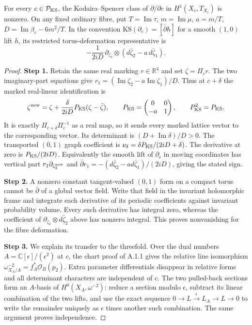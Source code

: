 \begin{cited}[FAM A.4.2; K]\label{fam:A.4.2}
For every $c\in\mathcal P_{\rm KS}$, the Kodaira--Spencer class of $\partial/\partial c$ in $H^1(X_c,T_{X_c})$ is nonzero. On any fixed ordinary fibre, put $T=\operatorname{Im}\tau$, $m=\operatorname{Im}\mu$, $a=m/T$, $D=\operatorname{Im}\beta_c-6m^2/T$. In the convention $\mathrm{KS}(\partial_c)=[\bar\partial h]$ for a smooth $(1,0)$ lift $h$, its restricted torus-deformation representative is
\[
 -\frac{1}{2iD}\,\partial_{\zeta_2}\otimes
       (d\bar\zeta_2-a\,d\bar\zeta_1).
\]
\end{cited}
\begin{proof}
\par\smallskip\noindent\textbf{Step 1.} Retain the same real marking $r\in\mathbb R^4$ and set $\zeta=\Pi_cr$. The two imaginary-part equations give
$r_1=(\operatorname{Im}\zeta_2-a\operatorname{Im}\zeta_1)/D$. Thus at $c+\delta$ the marked real-linear identification is
\[
 \zeta^{\rm new}=\zeta+\frac{\delta}{2iD}P_{\rm KS}(\zeta-\bar\zeta),\qquad
 P_{\rm KS}=\begin{pmatrix}0&0\\-a&1\end{pmatrix},\qquad P_{\rm KS}^2=P_{\rm KS}.
\]
It is exactly $\Pi_{c+\delta}\Pi_c^{-1}$ as a real map, so it sends every marked lattice vector to the corresponding vector. Its determinant is $(D+\operatorname{Im}\delta)/D>0$. The transported $(0,1)$ graph coefficient is $\nu_\delta=\delta P_{\rm KS}/(2iD+\delta)$. The derivative at zero is $P_{\rm KS}/(2iD)$. Equivalently the smooth lift of $\partial_c$ in moving coordinates has vertical part $r_1\partial_{\zeta^{\rm new}_2}$ and $\bar\partial r_1=-(d\bar\zeta_2-a d\bar\zeta_1)/(2iD)$, giving the stated sign.

\par\smallskip\noindent\textbf{Step 2.} A nonzero constant tangent-valued $(0,1)$ form on a compact torus cannot be $\bar\partial$ of a global vector field. Write that field in the invariant holomorphic frame and integrate each derivative of its periodic coefficients against invariant probability volume. Every such derivative has integral zero, whereas the coefficient of $\partial_{\zeta_2}\otimes d\bar\zeta_2$ above has nonzero integral. This proves nonvanishing for the fibre deformation.

\par\smallskip\noindent\textbf{Step 3.} We explain its transfer to the threefold. Over the dual numbers $A=\mathbb C[\epsilon]/(\epsilon^2)$ at $c$, the chart proof of A.1.1 gives the relative line isomorphism $\omega^{-2}_{X_A/A}=f_A^*\mathcal O_B(p_2)$. Extra parameter differentials disappear in relative forms and all determinant characters are independent of $c$. The two pulled-back sections form an $A$-basis of $H^0(X_A,\omega^{-2})$: reduce a section modulo $\epsilon$, subtract its linear combination of the two lifts, and use the exact sequence $0\to L\xrightarrow{\epsilon}L_A\to L\to0$ to write the remainder uniquely as $\epsilon$ times another such combination. The same argument proves independence.


\end{proof}
